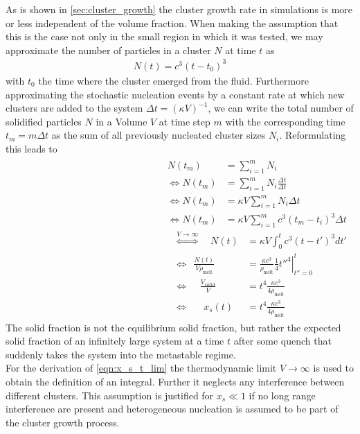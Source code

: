 As is shown in \autoref{sec:cluster_growth} the cluster growth rate in simulations is more or less independent of the volume fraction. When making the assumption that this is the case not only in the small region in which it was tested, we may approximate the number of particles in a cluster $N$ at time $t$ as 
\begin{align}
N(t) = c^3 (t-t_0)^3 
\end{align} 
with $t_0$ the time where the cluster emerged from the fluid. Furthermore approximating the stochastic nucleation events by a constant rate at which new clusters are added to the system $\Delta t = (\kappa V)^{-1}$, we can write the total number of solidified particles $N$ in a Volume $V$ at time step $m$ with the corresponding time $t_m = m \Delta t$ as the sum of all previously nucleated cluster sizes $N_i$. Reformulating this leads to
\begin{align}
\begin{split}
N(t_m)&=\sum_{i=1}^m N_i\\
\Leftrightarrow N(t_m)&=\sum_{i=1}^m N_i \frac{\Delta t}{\Delta t}\\
\Leftrightarrow N(t_m)&=\kappa V \sum_{i=1}^m N_i \Delta t\\
\Leftrightarrow N(t_m)&=\kappa V \sum_{i=1}^m c^3 (t_m-t_i)^3 \Delta t
\end{split}
\begin{split}
\label{eqn:x_s_t_lim}
\stackrel{V \rightarrow \infty } {\Leftrightarrow} \quad N(t)&=\kappa V \int_0^{t} c^3 (t - t')^3 d t'\\
\Leftrightarrow \; \, \frac{N(t)}{V \rho_{\text{melt}}}&=\frac{\kappa c^3}{\rho_{\text{melt}}} \left. \frac{1}{4}t''^4 \right|_{t''=0}^t\\
\Leftrightarrow \; \; \; \; \frac{V_{solid}}{V} &= t^4 \frac{\kappa c^3}{4 \rho_{\text{melt}}}\\
\Leftrightarrow \quad \; \: x_s(t)&= t^4 \frac{\kappa c^3}{4 \rho_{\text{melt}}}
\end{split}
\end{align}
The solid fraction is not the equilibrium solid fraction, but rather the expected solid fraction of an infinitely large system at a time $t$ after some quench that suddenly takes the system into the metastable regime.\\ 
For the derivation of \autoref{eqn:x_s_t_lim} the thermodynamic limit $V\rightarrow \infty$ is used to obtain the definition of an integral. Further it neglects any interference between different clusters. This assumption is justified for $x_s \ll 1$ if no long range interference are present and heterogeneous nucleation is assumed to be part of the cluster growth process.\\

